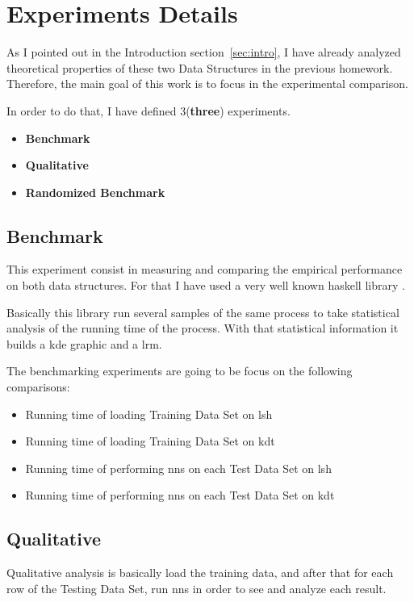 \documentclass[12pt, a4paper]{article}
\begin{document}
\section{Experiments Details}
As I pointed out in the Introduction section~\ref{sec:intro}, I have already analyzed theoretical properties of these two Data Structures in the previous homework. Therefore, the main goal of this work is to focus in the experimental comparison.

In order to do that, I have defined 3(\textbf{three}) experiments.

\begin{itemize}
  \item \textbf{Benchmark}
  \item \textbf{Qualitative}
  \item \textbf{Randomized Benchmark}
\end{itemize}

\subsection{Benchmark}\label{sub:sec:bench}
This experiment consist in measuring and comparing the empirical performance on both data structures. For that I have used a very well known \acrshort{haskell} library \cite{criterion}.

Basically this library run several samples of the same process to take statistical analysis of the running time of the process. With that statistical information it builds a \acrfull{kde} graphic and a \acrfull{lrm}.

The benchmarking experiments are going to be focus on the following comparisons:

\begin{itemize}
  \item Running time of loading Training Data Set on \acrshort{lsh}
  \item Running time of loading Training Data Set on \acrshort{kdt}
  \item Running time of performing \acrshort{nns} on each Test Data Set on \acrshort{lsh}
  \item Running time of performing \acrshort{nns} on each Test Data Set on \acrshort{kdt}
\end{itemize}

\subsection{Qualitative}
Qualitative analysis is basically load the training data, and after that for each row of the Testing Data Set, run \acrshort{nns} in order to see and analyze each result.
\end{document}

